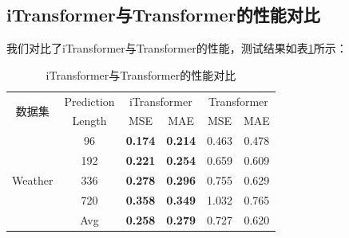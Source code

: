 \documentclass[twoside,12pt]{article}
\begin{document}
\subsection{iTransformer与Transformer的性能对比}
我们对比了iTransformer与Transformer的性能，测试结果如表\ref{tab:itransformer_vs_transformer}所示：
\begin{table}[htbp]
  \caption{\small{iTransformer与Transformer的性能对比}}
  \label{tab:itransformer_vs_transformer}
  \vspace{5pt}
  \centering
  \begin{tabular}{c|c|cc|cc}
    \toprule
    \multirow{2}{*}{数据集}  & Prediction & \multicolumn{2}{c|}{iTransformer} & \multicolumn{2}{c|}{Transformer}                 \\
    \cmidrule(lr){3-4} \cmidrule(lr){5-6}
                             & Length     & MSE                               & MAE                              & MSE   & MAE   \\
    \midrule
    \multirow{5}{*}{Weather} & 96         & \textbf{0.174}                    & \textbf{0.214}                   & 0.463 & 0.478 \\
                             & 192        & \textbf{0.221}                    & \textbf{0.254}                   & 0.659 & 0.609 \\
                             & 336        & \textbf{0.278}                    & \textbf{0.296}                   & 0.755 & 0.629 \\
                             & 720        & \textbf{0.358}                    & \textbf{0.349}                   & 1.032 & 0.765 \\
    \cmidrule(lr){2-6}
                             & Avg        & \textbf{0.258}                    & \textbf{0.279}                   & 0.727 & 0.620 \\
    \bottomrule
    \bottomrule
  \end{tabular}
\end{table}

\newpage
\end{document}
